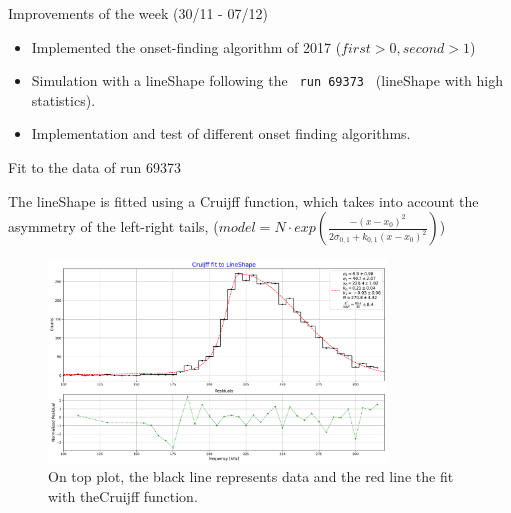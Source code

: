 \documentclass[8pt]{beamer}
\begin{document}
\begin{frame}{ Improvements of the week (30/11 - 07/12)}
\begin{itemize}
\item Implemented the onset-finding algorithm of 2017 ($first > 0 , second > 1$)
\item Simulation with a lineShape following the \texttt{ run 69373 } (lineShape with high statistics).
\item Implementation and test of different onset finding algorithms.
\end{itemize}
\end{frame}

\begin{frame}{Fit to the data of run 69373}

The lineShape is fitted using a Cruijff function, which takes into account the asymmetry of the left-right tails, ($model = N \cdot exp(  \frac{-(x - x_{0})^2}{2\sigma_{0,1} + k_{0,1}(x - x_{0})^{2}})$) 

\begin{figure}[hbtp]
\centering
\includegraphics[width = 0.8\textwidth ]{../Plot/FitToLineShape.pdf}
\caption{On top plot, the black line represents data and the red line the fit with the\newline Cruijff function.}
\end{figure}
\end{frame}
\end{document}
